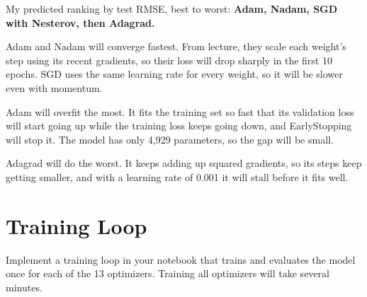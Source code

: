 \documentclass[12pt,a4paper]{article}
\begin{document}
\begin{answerbox}
My predicted ranking by test RMSE, best to worst: \textbf{Adam, Nadam, SGD with Nesterov, then Adagrad.}

Adam and Nadam will converge fastest. From lecture, they scale each weight's step using its recent gradients, so their loss will drop sharply in the first 10 epochs. SGD uses the same learning rate for every weight, so it will be slower even with momentum.

Adam will overfit the most. It fits the training set so fast that its validation loss will start going up while the training loss keeps going down, and EarlyStopping will stop it. The model has only 4,929 parameters, so the gap will be small.

Adagrad will do the worst. It keeps adding up squared gradients, so its steps keep getting smaller, and with a learning rate of 0.001 it will stall before it fits well.

\end{answerbox}


\section{Training Loop}

Implement a training loop in your notebook that trains and evaluates the model once
for each of the 13 optimizers. Training all optimizers will take several minutes.
\end{document}
